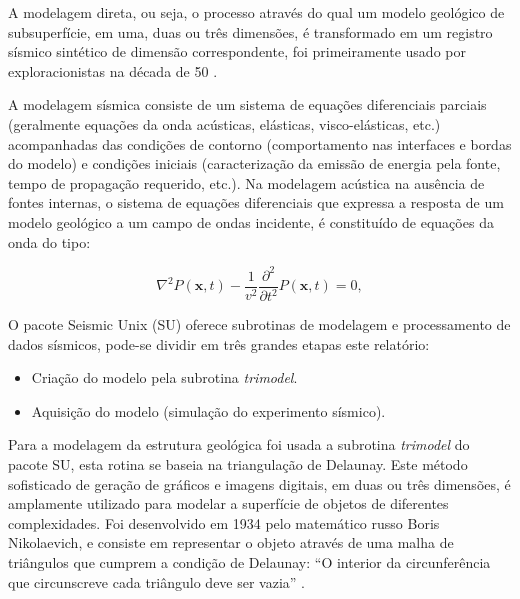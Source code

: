 A modelagem direta, ou seja, o processo através do qual um modelo geológico de subsuperfície, em uma, duas ou três dimensões, é transformado em um registro sísmico sintético de dimensão correspondente, foi primeiramente usado por exploracionistas na década de 50 \cite{Edwards(1988)}.

A modelagem sísmica consiste de um sistema de equações diferenciais parciais (geralmente equações da onda acústicas, elásticas, visco-elásticas, etc.) acompanhadas das condições de contorno (comportamento nas interfaces e bordas do modelo) e condições iniciais (caracterização da emissão de energia pela fonte, tempo de propagação requerido, etc.). Na modelagem acústica na ausência de fontes internas, o sistema de equações diferenciais que expressa a resposta de um modelo geológico a um campo de ondas incidente, é constituído de equações da onda do tipo:

\begin{equation}
\nabla^{2}P(\mathbf{x},t)-\frac{1}{v^{2}}\frac{\partial^{2}}{\partial t^{2}}P(\mathbf{x},t)= 0,
\label{eq:Equacao_onda_acustica_0}
\end{equation}


O pacote Seismic Unix (SU) oferece subrotinas de modelagem e processamento de dados sísmicos, pode-se dividir em três grandes etapas este relatório:

\begin{itemize}
\item Criação do modelo pela subrotina \textit{trimodel}.
\item Aquisição do modelo (simulação do experimento sísmico).
\end{itemize}

Para a modelagem da estrutura geológica foi usada a subrotina \textit{trimodel} do pacote SU, esta rotina se baseia na triangulação de Delaunay. Este método sofisticado de geração de gráficos e imagens digitais, em duas ou três dimensões, é amplamente utilizado para modelar
a superfície de objetos de diferentes complexidades. Foi desenvolvido em 1934 pelo matemático russo Boris Nikolaevich, e consiste em representar o objeto através de uma malha de triângulos que cumprem a condição de Delaunay: ``O interior da circunferência que circunscreve cada triângulo deve ser vazia'' \cite{Hale(1991)}.


